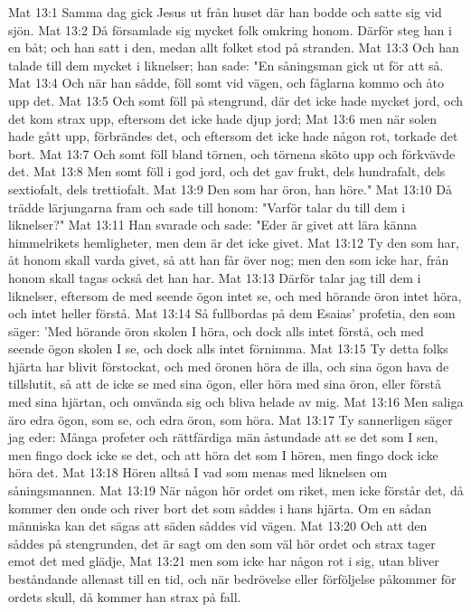 Mat 13:1  Samma dag gick Jesus ut från huset där han bodde och satte sig vid sjön.
Mat 13:2  Då församlade sig mycket folk omkring honom. Därför steg han i en båt; och han satt i den, medan allt folket stod på stranden.
Mat 13:3  Och han talade till dem mycket i liknelser; han sade: "En såningsman gick ut för att så.
Mat 13:4  Och när han sådde, föll somt vid vägen, och fåglarna kommo och åto upp det.
Mat 13:5  Och somt föll på stengrund, där det icke hade mycket jord, och det kom strax upp, eftersom det icke hade djup jord;
Mat 13:6  men när solen hade gått upp, förbrändes det, och eftersom det icke hade någon rot, torkade det bort.
Mat 13:7  Och somt föll bland törnen, och törnena sköto upp och förkvävde det.
Mat 13:8  Men somt föll i god jord, och det gav frukt, dels hundrafalt, dels sextiofalt, dels trettiofalt.
Mat 13:9  Den som har öron, han höre."
Mat 13:10  Då trädde lärjungarna fram och sade till honom: "Varför talar du till dem i liknelser?"
Mat 13:11  Han svarade och sade: "Eder är givet att lära känna himmelrikets hemligheter, men dem är det icke givet.
Mat 13:12  Ty den som har, åt honom skall varda givet, så att han får över nog; men den som icke har, från honom skall tagas också det han har.
Mat 13:13  Därför talar jag till dem i liknelser, eftersom de med seende ögon intet se, och med hörande öron intet höra, och intet heller förstå.
Mat 13:14  Så fullbordas på dem Esaias' profetia, den som säger: 'Med hörande öron skolen I höra, och dock alls intet förstå, och med seende ögon skolen I se, och dock alls intet förnimma.
Mat 13:15  Ty detta folks hjärta har blivit förstockat, och med öronen höra de illa, och sina ögon hava de tillslutit, så att de icke se med sina ögon, eller höra med sina öron, eller förstå med sina hjärtan, och omvända sig och bliva helade av mig.
Mat 13:16  Men saliga äro edra ögon, som se, och edra öron, som höra.
Mat 13:17  Ty sannerligen säger jag eder: Många profeter och rättfärdiga män åstundade att se det som I sen, men fingo dock icke se det, och att höra det som I hören, men fingo dock icke höra det.
Mat 13:18  Hören alltså I vad som menas med liknelsen om såningsmannen.
Mat 13:19  När någon hör ordet om riket, men icke förstår det, då kommer den onde och river bort det som såddes i hans hjärta. Om en sådan människa kan det sägas att säden såddes vid vägen.
Mat 13:20  Och att den såddes på stengrunden, det är sagt om den som väl hör ordet och strax tager emot det med glädje,
Mat 13:21  men som icke har någon rot i sig, utan bliver beståndande allenast till en tid, och när bedrövelse eller förföljelse påkommer för ordets skull, då kommer han strax på fall.
